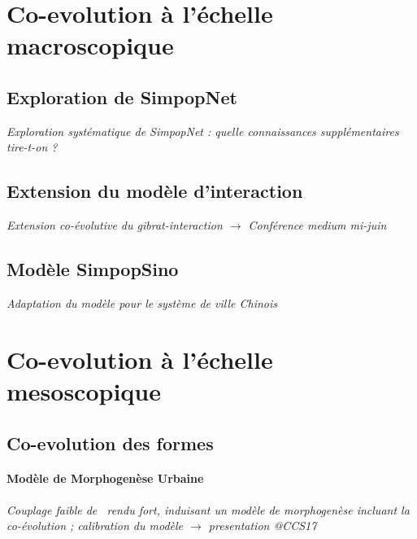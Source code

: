 
\section{Co-evolution à l'échelle macroscopique}

\subsection{Exploration de SimpopNet}

\textit{Exploration systématique de SimpopNet : quelle connaissances supplémentaires tire-t-on ?}

\subsection{Extension du modèle d'interaction}


\textit{Extension co-évolutive du gibrat-interaction $\rightarrow$ Conférence medium mi-juin}


\subsection{Modèle SimpopSino}

\textit{Adaptation du modèle pour le système de ville Chinois}





\section{Co-evolution à l'échelle mesoscopique}

\subsection{Co-evolution des formes}

\paragraph{Modèle de Morphogenèse Urbaine}


\textit{Couplage faible de~\cite{raimbault2016generation} rendu fort, induisant un modèle de morphogenèse incluant la co-évolution ; calibration du modèle $\rightarrow$ presentation @CCS17}

